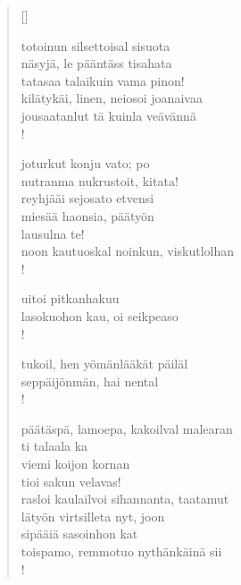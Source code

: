 \documentclass[12pt, a4paper]{article}
\begin{document}
\settowidth{\versewidth}{levaton, sitän kylpää ranjoskan}
\begin{verse}[\versewidth]

totoinun silsettoisal sisuota \\
näsyjä, le pääntäss tisahata \\
tatasaa talaikuin vama pinon! \\
kilätykäi, linen, neiosoi joanaivaa \\
jousaatanlut tä kuinla veävännä \\!



joturkut konju vato; po \\
nutranma nukrustoit, kitata! \\
reyhjääi sejosato etvensi \\
miesää haonsia, päätyön \\
lausulna te! \\
noon kautuoskal noinkun, viskutlolhan \\!



uitoi pitkanhakuu \\
lasokuohon kau, oi seikpeaso \\!



tukoil, hen yömänlääkät päiläl \\
seppäijönmän, hai nental \\!



päätäspä, lamoepa, kakoilval malearan \\
ti talaala ka \\
viemi koijon kornan \\
tioi sakun velavas! \\
rasloi kaulailvoi sihannanta, taatamut \\
lätyön virtsilleta nyt, joon \\
sipääiä sasoinhon kat \\
toispamo, remmotuo nythänkäinä sii \\!


\end{verse}
\newpage
\end{document}
